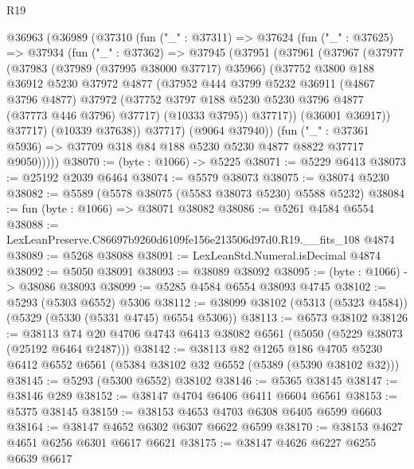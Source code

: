\begin{lexlean}{R19}
\begin{coremodule}
  @36963
    (@36989
      (@37310
        (fun ("_" : @37311) =>
        @37624
          (fun ("_" : @37625) =>
          @37934
            (fun ("_" : @37362) =>
            @37945
              (@37951
                (@37961
                  (@37967
                    (@37977
                      (@37983
                        (@37989 (@37995 @38000 @37717) @35966)
                        (@37752
                          @3800
                          @188
                          @36912
                          @5230
                          @37972
                          @4877
                          (@37952
                            @444
                            @3799
                            @5232
                            @36911
                            (@4867 @3796 @4877)
                            @37972
                            (@37752 @3797 @188 @5230 @5230 @3796 @4877 (@37773 @446 @3796) @37717)
                            (@10333 @3795))
                          @37717))
                      (@36001 @36917))
                    @37717)
                  (@10339 @37638))
                @37717)
              (@9064 @37940))
            (fun ("_" : @37361 @5936) =>
            @37709 @318 @84 @188 @5230 @5230 @4877 @8822 @37717 @9050)))))
@38070 := (byte : @1066) -> @5225
@38071 := @5229 @6413
@38073 := @25192 @2039 @6464
@38074 := @5579 @38073
@38075 := @38074 @5230
@38082 := @5589 (@5578 @38075 (@5583 @38073 @5230) @5588 @5232)
@38084 := fun (byte : @1066) => @38071 @38082
@38086 := @5261 @4584 @6554
@38088 := LexLeanPreserve.C86697b9260d6109fe156e213506d97d0.R19.__fits_108 @4874
@38089 := @5268 @38088
@38091 := LexLeanStd.Numeral.isDecimal @4874
@38092 := @5050 @38091
@38093 := @38089 @38092
@38095 := (byte : @1066) -> @38086 @38093
@38099 := @5285 @4584 @6554 @38093 @4745
@38102 := @5293 (@5303 @6552) @5306
@38112 := @38099 @38102 (@5313 (@5323 @4584)) (@5329 (@5330 (@5331 @4745) @6554 @5306))
@38113 := @6573 @38102
@38126 := @38113 @74 @20 @4706 @4743 @6413 @38082 @6561 (@5050 (@5229 @38073 (@25192 @6464 @2487)))
@38142 := @38113
    @82
    @1265
    @186
    @4705
    @5230
    @6412
    @6552
    @6561
    (@5384 @38102 @32 @6552 (@5389 (@5390 @38102 @32)))
@38145 := @5293 (@5300 @6552) @38102
@38146 := @5365 @38145
@38147 := @38146 @289
@38152 := @38147 @4704 @6406 @6411 @6604 @6561
@38153 := @5375 @38145
@38159 := @38153 @4653 @4703 @6308 @6405 @6599 @6603
@38164 := @38147 @4652 @6302 @6307 @6622 @6599
@38170 := @38153 @4627 @4651 @6256 @6301 @6617 @6621
@38175 := @38147 @4626 @6227 @6255 @6639 @6617

\end{coremodule}
\end{lexlean}
